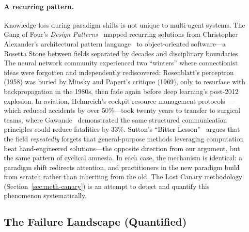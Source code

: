 \documentclass{article}
\begin{document}
\paragraph{A recurring pattern.}
Knowledge loss during paradigm shifts is not unique to multi-agent systems.
The Gang of Four's \emph{Design Patterns}~\citep{gamma1994design} mapped recurring
solutions from Christopher Alexander's architectural pattern
language~\citep{alexander1977pattern} to object-oriented software---a Rosetta Stone
between fields separated by decades and disciplinary boundaries.  The neural network
community experienced two ``winters'' where connectionist ideas were forgotten and
independently rediscovered: Rosenblatt's perceptron (1958) was buried by Minsky and
Papert's critique (1969), only to resurface with backpropagation in the 1980s, then
fade again before deep learning's post-2012 explosion.  In aviation, Helmreich's
cockpit resource management protocols~\citep{helmreich1999cockpit}---which reduced
accidents by over 50\%---took twenty years to transfer to surgical teams, where
Gawande~\citep{gawande2011checklist} demonstrated the same structured communication
principles could reduce fatalities by 33\%.  Sutton's ``Bitter
Lesson''~\citep{sutton2019bitter} argues that the field \emph{repeatedly} forgets that
general-purpose methods leveraging computation beat hand-engineered solutions---the
opposite direction from our argument, but the same pattern of cyclical amnesia.  In
each case, the mechanism is identical: a paradigm shift redirects attention, and
practitioners in the new paradigm build from scratch rather than inheriting from the
old.  The Lost Canary methodology (Section~\ref{sec:meth-canary}) is an attempt to
detect and quantify this phenomenon systematically.

\subsection{The Failure Landscape (Quantified)}
\label{sec:bg-failures}

%
%
%
%
%
%
\end{document}

